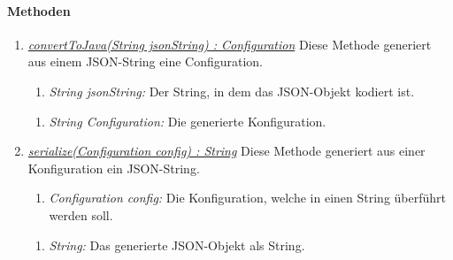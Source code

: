 \paragraph{Methoden}
\begin{enumerate}[+]
	\item \textit{\underline{convertToJava(String jsonString) : Configuration}} Diese Methode generiert aus einem JSON-String eine Configuration.
	\begin{enumerate}[$\bullet$]
		\item \textit{String jsonString:} Der String, in dem das JSON-Objekt kodiert ist.
	\end{enumerate}
	\begin{enumerate}[$\circ$]
		\item \textit{String Configuration:} Die generierte Konfiguration.
	\end{enumerate}
	
	\item \textit{\underline{serialize(Configuration config) : String}} Diese Methode generiert aus einer Konfiguration ein JSON-String.
	\begin{enumerate}[$\bullet$]
		\item \textit{Configuration config:} Die Konfiguration, welche in einen String überführt werden soll.
	\end{enumerate}
	\begin{enumerate}[$\circ$]
		\item \textit{String:} Das generierte JSON-Objekt als String.
	\end{enumerate}
\end{enumerate}
